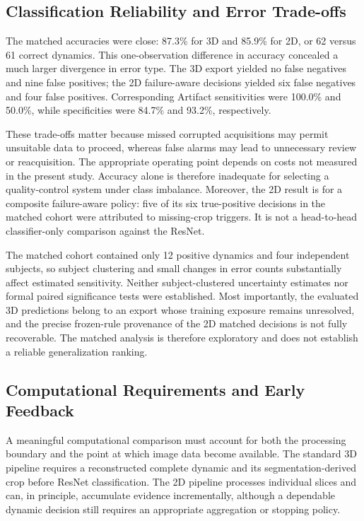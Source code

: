 \subsection{Classification Reliability and Error Trade-offs}
\label{subsec:discussion_comparison_errors}

The matched accuracies were close: 87.3\% for 3D and 85.9\% for 2D, or 62 versus 61 correct dynamics. This one-observation difference in accuracy concealed a much larger divergence in error type. The 3D export yielded no false negatives and nine false positives; the 2D failure-aware decisions yielded six false negatives and four false positives. Corresponding Artifact sensitivities were 100.0\% and 50.0\%, while specificities were 84.7\% and 93.2\%, respectively.

These trade-offs matter because missed corrupted acquisitions may permit unsuitable data to proceed, whereas false alarms may lead to unnecessary review or reacquisition. The appropriate operating point depends on costs not measured in the present study. Accuracy alone is therefore inadequate for selecting a quality-control system under class imbalance. Moreover, the 2D result is for a composite failure-aware policy: five of its six true-positive decisions in the matched cohort were attributed to missing-crop triggers. It is not a head-to-head classifier-only comparison against the ResNet.

The matched cohort contained only 12 positive dynamics and four independent subjects, so subject clustering and small changes in error counts substantially affect estimated sensitivity. Neither subject-clustered uncertainty estimates nor formal paired significance tests were established. Most importantly, the evaluated 3D predictions belong to an export whose training exposure remains unresolved, and the precise frozen-rule provenance of the 2D matched decisions is not fully recoverable. The matched analysis is therefore exploratory and does not establish a reliable generalization ranking.

\subsection{Computational Requirements and Early Feedback}
\label{subsec:discussion_comparison_runtime}

A meaningful computational comparison must account for both the processing boundary and the point at which image data become available. The standard 3D pipeline requires a reconstructed complete dynamic and its segmentation-derived crop before ResNet classification. The 2D pipeline processes individual slices and can, in principle, accumulate evidence incrementally, although a dependable dynamic decision still requires an appropriate aggregation or stopping policy.

